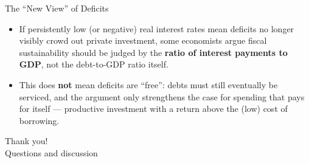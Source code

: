 \documentclass[11pt,aspectratio=169]{beamer}
\begin{document}
\begin{frame}{The ``New View'' of Deficits}
 
  \begin{itemize}
    \item If persistently low (or negative) real interest rates mean deficits no longer visibly crowd out private investment, some economists argue fiscal sustainability should be judged by the \textbf{ratio of interest payments to GDP}, not the debt-to-GDP ratio itself.
    \item This does \textbf{not} mean deficits are ``free'': debts must still eventually be serviced, and the argument only strengthens the case for spending that pays for itself --- productive investment with a return above the (low) cost of borrowing.
\end{itemize}
\end{frame}

 

\begin{frame}[standout]
  Thank you!\\
  \vspace{0.5em}
  \small Questions and discussion
\end{frame}
\end{document}

